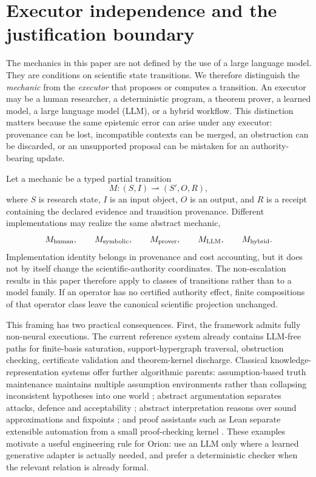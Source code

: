 \section{Executor independence and the justification boundary}\label{sec:executor-independence}

The mechanics in this paper are not defined by the use of a large language model. They are conditions on scientific state transitions. We therefore distinguish the \emph{mechanic} from the \emph{executor} that proposes or computes a transition. An executor may be a human researcher, a deterministic program, a theorem prover, a learned model, a large language model (LLM), or a hybrid workflow. This distinction matters because the same epistemic error can arise under any executor: provenance can be lost, incompatible contexts can be merged, an obstruction can be discarded, or an unsupported proposal can be mistaken for an authority-bearing update.

Let a mechanic be a typed partial transition
\[
M:(S,I)\rightharpoonup(S',O,R),
\]
where $S$ is research state, $I$ is an input object, $O$ is an output, and $R$ is a receipt containing the declared evidence and transition provenance. Different implementations may realize the same abstract mechanic,
\[
M_{\rm human},\qquad M_{\rm symbolic},\qquad M_{\rm prover},\qquad M_{\rm LLM},\qquad M_{\rm hybrid}.
\]
Implementation identity belongs in provenance and cost accounting, but it does not by itself change the scientific-authority coordinates. The non-escalation results in this paper therefore apply to classes of transitions rather than to a model family. If an operator has no certified authority effect, finite compositions of that operator class leave the canonical scientific projection unchanged.

This framing has two practical consequences. First, the framework admits fully non-neural executions. The current reference system already contains LLM-free paths for finite-basis saturation, support-hypergraph traversal, obstruction checking, certificate validation and theorem-kernel discharge. Classical knowledge-representation systems offer further algorithmic parents: assumption-based truth maintenance maintains multiple assumption environments rather than collapsing inconsistent hypotheses into one world \cite{dekleer1986}; abstract argumentation separates attacks, defence and acceptability \cite{dung1995}; abstract interpretation reasons over sound approximations and fixpoints \cite{cousot1977}; and proof assistants such as Lean separate extensible automation from a small proof-checking kernel \cite{demoura2021lean}. These examples motivate a useful engineering rule for Orion: use an LLM only where a learned generative adapter is actually needed, and prefer a deterministic checker when the relevant relation is already formal.

